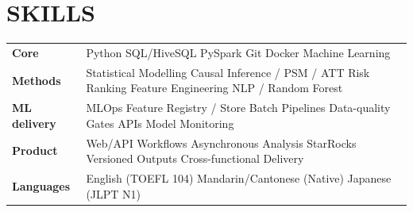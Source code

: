 \documentclass[a4paper,10pt]{article}
\begin{document}
\section{SKILLS}
\begin{tabular}{@{}p{2.8cm}p{14.2cm}@{}}
\textbf{Core} & Python \textperiodcentered{} SQL/HiveSQL \textperiodcentered{} PySpark \textperiodcentered{} Git \textperiodcentered{} Docker \textperiodcentered{} Machine Learning \\[2pt]
\textbf{Methods} & Statistical Modelling \textperiodcentered{} Causal Inference / PSM / ATT \textperiodcentered{} Risk Ranking \textperiodcentered{} Feature Engineering \textperiodcentered{} NLP / Random Forest \\[2pt]
\textbf{ML delivery} & MLOps \textperiodcentered{} Feature Registry / Store \textperiodcentered{} Batch Pipelines \textperiodcentered{} Data-quality Gates \textperiodcentered{} APIs \textperiodcentered{} Model Monitoring \\[2pt]
\textbf{Product} & Web/API Workflows \textperiodcentered{} Asynchronous Analysis \textperiodcentered{} StarRocks \textperiodcentered{} Versioned Outputs \textperiodcentered{} Cross-functional Delivery \\[2pt]
\textbf{Languages} & English (TOEFL 104) \textperiodcentered{} Mandarin/Cantonese (Native) \textperiodcentered{} Japanese (JLPT N1) \\
\end{tabular}
\end{document}
